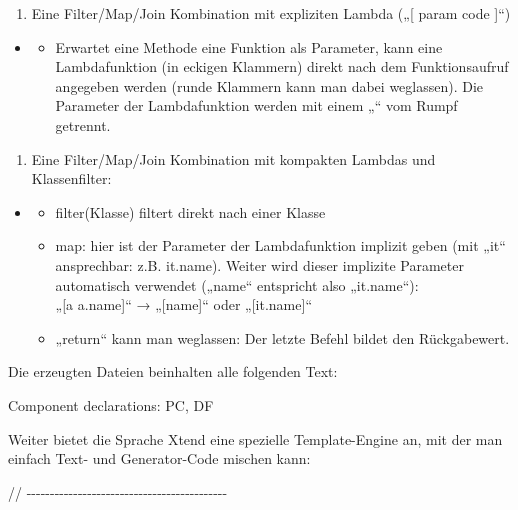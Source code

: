 \documentclass[a4]{article}
\providecommand{\tightlist}{%
  \setlength{\itemsep}{0pt}\setlength{\parskip}{0pt}}
\begin{document}
\begin{enumerate}
\def\labelenumi{\arabic{enumi}.}
\tightlist
\item
  Eine Filter/Map/Join Kombination mit expliziten Lambda („{[} param
  \textbar{} code {]}``)
\end{enumerate}

\begin{itemize}
\item
  \begin{itemize}
  \tightlist
  \item
    Erwartet eine Methode eine Funktion als Parameter, kann eine
    Lambdafunktion (in eckigen Klammern) direkt nach dem Funktionsaufruf
    angegeben werden (runde Klammern kann man dabei weglassen). Die
    Parameter der Lambdafunktion werden mit einem „\textbar{}`` vom
    Rumpf getrennt.
  \end{itemize}
\end{itemize}

\begin{enumerate}
\def\labelenumi{\arabic{enumi}.}
\tightlist
\item
  Eine Filter/Map/Join Kombination mit kompakten Lambdas und
  Klassenfilter: 
\end{enumerate}

\begin{itemize}
\item
  \begin{itemize}
  \tightlist
  \item
    filter(Klasse) filtert direkt nach einer Klasse
  \item
    map: hier ist der Parameter der Lambdafunktion implizit geben (mit
    „it`` ansprechbar: z.B. it.name). Weiter wird dieser implizite
    Parameter automatisch verwendet („name`` entspricht also
    „it.name``):\\
    „{[}a \textbar{} a.name{]}`` → „{[}name{]}`` oder „{[}it.name{]}``
  \item
    „return`` kann man weglassen: Der letzte Befehl bildet den
    Rückgabewert.
  \end{itemize}
\end{itemize}

Die erzeugten Dateien beinhalten alle folgenden Text:

Component declarations: PC, DF

Weiter bietet die Sprache Xtend eine spezielle Template-Engine an, mit
der man einfach Text- und Generator-Code mischen kann:

//
-\/-\/-\/-\/-\/-\/-\/-\/-\/-\/-\/-\/-\/-\/-\/-\/-\/-\/-\/-\/-\/-\/-\/-\/-\/-\/-\/-\/-\/-\/-\/-\/-\/-\/-\/-\/-\/-\/-\/-\/-\/-\/-
\end{document}
